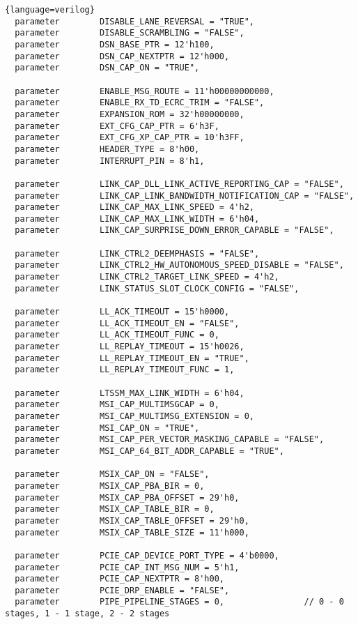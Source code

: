 \begin{lstlisting}{language=verilog}
  parameter        DISABLE_LANE_REVERSAL = "TRUE", 
  parameter        DISABLE_SCRAMBLING = "FALSE", 
  parameter        DSN_BASE_PTR = 12'h100, 
  parameter        DSN_CAP_NEXTPTR = 12'h000, 
  parameter        DSN_CAP_ON = "TRUE", 

  parameter        ENABLE_MSG_ROUTE = 11'h00000000000, 
  parameter        ENABLE_RX_TD_ECRC_TRIM = "FALSE", 
  parameter        EXPANSION_ROM = 32'h00000000, 
  parameter        EXT_CFG_CAP_PTR = 6'h3F, 
  parameter        EXT_CFG_XP_CAP_PTR = 10'h3FF, 
  parameter        HEADER_TYPE = 8'h00, 
  parameter        INTERRUPT_PIN = 8'h1, 

  parameter        LINK_CAP_DLL_LINK_ACTIVE_REPORTING_CAP = "FALSE", 
  parameter        LINK_CAP_LINK_BANDWIDTH_NOTIFICATION_CAP = "FALSE", 
  parameter        LINK_CAP_MAX_LINK_SPEED = 4'h2, 
  parameter        LINK_CAP_MAX_LINK_WIDTH = 6'h04, 
  parameter        LINK_CAP_SURPRISE_DOWN_ERROR_CAPABLE = "FALSE", 

  parameter        LINK_CTRL2_DEEMPHASIS = "FALSE", 
  parameter        LINK_CTRL2_HW_AUTONOMOUS_SPEED_DISABLE = "FALSE", 
  parameter        LINK_CTRL2_TARGET_LINK_SPEED = 4'h2, 
  parameter        LINK_STATUS_SLOT_CLOCK_CONFIG = "FALSE", 

  parameter        LL_ACK_TIMEOUT = 15'h0000, 
  parameter        LL_ACK_TIMEOUT_EN = "FALSE", 
  parameter        LL_ACK_TIMEOUT_FUNC = 0, 
  parameter        LL_REPLAY_TIMEOUT = 15'h0026, 
  parameter        LL_REPLAY_TIMEOUT_EN = "TRUE", 
  parameter        LL_REPLAY_TIMEOUT_FUNC = 1, 

  parameter        LTSSM_MAX_LINK_WIDTH = 6'h04, 
  parameter        MSI_CAP_MULTIMSGCAP = 0, 
  parameter        MSI_CAP_MULTIMSG_EXTENSION = 0, 
  parameter        MSI_CAP_ON = "TRUE", 
  parameter        MSI_CAP_PER_VECTOR_MASKING_CAPABLE = "FALSE", 
  parameter        MSI_CAP_64_BIT_ADDR_CAPABLE = "TRUE", 

  parameter        MSIX_CAP_ON = "FALSE", 
  parameter        MSIX_CAP_PBA_BIR = 0, 
  parameter        MSIX_CAP_PBA_OFFSET = 29'h0, 
  parameter        MSIX_CAP_TABLE_BIR = 0, 
  parameter        MSIX_CAP_TABLE_OFFSET = 29'h0, 
  parameter        MSIX_CAP_TABLE_SIZE = 11'h000, 

  parameter        PCIE_CAP_DEVICE_PORT_TYPE = 4'b0000, 
  parameter        PCIE_CAP_INT_MSG_NUM = 5'h1, 
  parameter        PCIE_CAP_NEXTPTR = 8'h00, 
  parameter        PCIE_DRP_ENABLE = "FALSE", 
  parameter        PIPE_PIPELINE_STAGES = 0,                // 0 - 0 stages, 1 - 1 stage, 2 - 2 stages   


\end{lstlisting}
